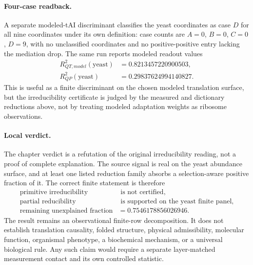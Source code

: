\paragraph{Four-case readback.}
A separate modeled-tAI discriminant classifies the yeast coordinates as case $D$ for all nine coordinates under its own definition: case counts are $A=0$, $B=0$, $C=0$, $D=9$, with no unclassified coordinates and no positive-positive entry lacking the mediation drop.  The same run reports modeled readout values
$$
\begin{aligned}
R^2_{QT,model}(\text{yeast}) &= 0.8213457220900503,\\
R^2_{QP}(\text{yeast}) &= 0.29837624994140827.
\end{aligned}
$$
This is useful as a finite discriminant on the chosen modeled translation surface, but the irreducibility certificate is judged by the measured and dictionary reductions above, not by treating modeled adaptation weights as ribosome observations.

\paragraph{Local verdict.}
The chapter verdict is a refutation of the original irreducibility reading, not a proof of complete explanation.  The source signal is real on the yeast abundance surface, and at least one listed reduction family absorbs a selection-aware positive fraction of it.  The correct finite statement is therefore
$$
\begin{aligned}
\text{primitive irreducibility} &\text{ is not certified},\\
\text{partial reducibility} &\text{ is supported on the yeast finite panel},\\
\text{remaining unexplained fraction} &= 0.7546178856026946.
\end{aligned}
$$
The result remains an observational finite-row decomposition.  It does not establish translation causality, folded structure, physical admissibility, molecular function, organismal phenotype, a biochemical mechanism, or a universal biological rule.  Any such claim would require a separate layer-matched measurement contact and its own controlled statistic.